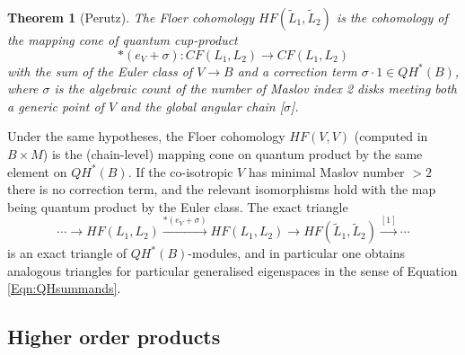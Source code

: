 \documentclass[reqno,10pt]{amsart}
\numberwithin{equation}{section}
\newtheorem{Theorem}[thm]{Theorem}
\theoremstyle{remark}
\begin{document}
\begin{Theorem}[Perutz] \label{Thm:Gysin}
The Floer cohomology $HF(\tilde{L}_1, \tilde{L}_2)$ is the cohomology of the mapping cone of quantum cup-product
\[
\ast(e_V + \sigma): CF(L_1,L_2) \rightarrow CF(L_1,L_2)
\]
with the sum of the Euler class of $V\rightarrow B$ and a correction term $\sigma \cdot 1 \in QH^*(B)$, where $\sigma$ is the algebraic count of the number of Maslov index 2 disks meeting both a generic point of $V$ and the global angular chain [$\sigma$]. 
\end{Theorem}

Under the same hypotheses, the Floer cohomology $HF(V,V)$ (computed in $B\times M$) is the (chain-level) mapping cone on quantum product by the same element on $QH^*(B)$.  If the co-isotropic $V$ has minimal Maslov number $>2$ there is no correction term, and the relevant isomorphisms hold with the map being quantum product by the Euler class.  The exact triangle
\begin{equation} \label{Eqn:LagQuantumGysin}
\cdots \longrightarrow HF(L_1,L_2) \xrightarrow{\ast(e_V+\sigma)}HF(L_1,L_2) \longrightarrow HF(\tilde{L}_1, \tilde{L}_2) \stackrel{[1]}{\longrightarrow} \cdots
\end{equation}
is an exact triangle of $QH^*(B)$-modules, and in particular one obtains analogous triangles for particular generalised eigenspaces in the sense of Equation \ref{Eqn:QHsummands}.

 
 

\subsection{Higher order products\label{SubSec:Fukaya}}
\end{document}
